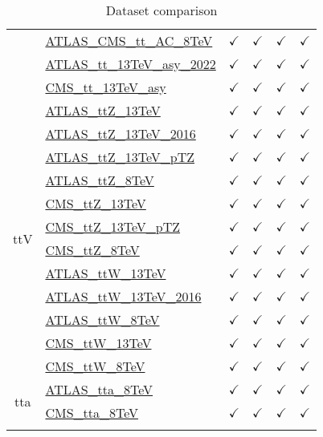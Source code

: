 \documentclass{article}
\begin{document}
\begin{longtable}{|c|l|c|c|c|c|}
 & \href{https://arxiv.org}{ATLAS_CMS_tt_AC_8TeV}  & $\checkmark$ & $\checkmark$ & $\checkmark$ & $\checkmark$\\ \cline{2-6}
 & \href{https://arxiv.org}{ATLAS_tt_13TeV_asy_2022}  & $\checkmark$ & $\checkmark$ & $\checkmark$ & $\checkmark$\\ \cline{2-6}
 & \href{https://arxiv.org}{CMS_tt_13TeV_asy}  & $\checkmark$ & $\checkmark$ & $\checkmark$ & $\checkmark$
\\ \hline
\multirow{12}{*}{ttV}
 & \href{https://arxiv.org}{ATLAS_ttZ_13TeV}  & $\checkmark$ & $\checkmark$ & $\checkmark$ & $\checkmark$\\ \cline{2-6}
 & \href{https://arxiv.org}{ATLAS_ttZ_13TeV_2016}  & $\checkmark$ & $\checkmark$ & $\checkmark$ & $\checkmark$\\ \cline{2-6}
 & \href{https://arxiv.org}{ATLAS_ttZ_13TeV_pTZ}  & $\checkmark$ & $\checkmark$ & $\checkmark$ & $\checkmark$\\ \cline{2-6}
 & \href{https://arxiv.org}{ATLAS_ttZ_8TeV}  & $\checkmark$ & $\checkmark$ & $\checkmark$ & $\checkmark$\\ \cline{2-6}
 & \href{https://arxiv.org}{CMS_ttZ_13TeV}  & $\checkmark$ & $\checkmark$ & $\checkmark$ & $\checkmark$\\ \cline{2-6}
 & \href{https://arxiv.org}{CMS_ttZ_13TeV_pTZ}  & $\checkmark$ & $\checkmark$ & $\checkmark$ & $\checkmark$\\ \cline{2-6}
 & \href{https://arxiv.org}{CMS_ttZ_8TeV}  & $\checkmark$ & $\checkmark$ & $\checkmark$ & $\checkmark$\\ \cline{2-6}
 & \href{https://arxiv.org}{ATLAS_ttW_13TeV}  & $\checkmark$ & $\checkmark$ & $\checkmark$ & $\checkmark$\\ \cline{2-6}
 & \href{https://arxiv.org}{ATLAS_ttW_13TeV_2016}  & $\checkmark$ & $\checkmark$ & $\checkmark$ & $\checkmark$\\ \cline{2-6}
 & \href{https://arxiv.org}{ATLAS_ttW_8TeV}  & $\checkmark$ & $\checkmark$ & $\checkmark$ & $\checkmark$\\ \cline{2-6}
 & \href{https://arxiv.org}{CMS_ttW_13TeV}  & $\checkmark$ & $\checkmark$ & $\checkmark$ & $\checkmark$\\ \cline{2-6}
 & \href{https://arxiv.org}{CMS_ttW_8TeV}  & $\checkmark$ & $\checkmark$ & $\checkmark$ & $\checkmark$
\\ \hline
\multirow{2}{*}{tta}
 & \href{https://arxiv.org}{ATLAS_tta_8TeV}  & $\checkmark$ & $\checkmark$ & $\checkmark$ & $\checkmark$\\ \cline{2-6}
 & \href{https://arxiv.org}{CMS_tta_8TeV}  & $\checkmark$ & $\checkmark$ & $\checkmark$ & $\checkmark$
\\ \hline
\caption{Dataset comparison}
\end{longtable}
\end{document}

